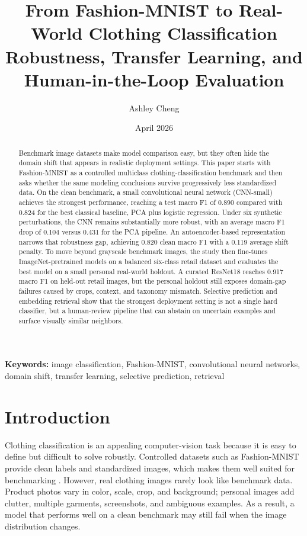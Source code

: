 \documentclass[11pt]{article}
\title{\textbf{From Fashion-MNIST to Real-World Clothing Classification}\\
\large Robustness, Transfer Learning, and Human-in-the-Loop Evaluation}
\author{Ashley Cheng}
\date{April 2026}
\begin{document}
\maketitle

\begin{abstract}
Benchmark image datasets make model comparison easy, but they often hide the domain shift that appears in realistic deployment settings. This paper starts with Fashion-MNIST as a controlled multiclass clothing-classification benchmark and then asks whether the same modeling conclusions survive progressively less standardized data. On the clean benchmark, a small convolutional neural network (CNN-small) achieves the strongest performance, reaching a test macro F1 of 0.890 compared with 0.824 for the best classical baseline, PCA plus logistic regression. Under six synthetic perturbations, the CNN remains substantially more robust, with an average macro F1 drop of 0.104 versus 0.431 for the PCA pipeline. An autoencoder-based representation narrows that robustness gap, achieving 0.820 clean macro F1 with a 0.119 average shift penalty. To move beyond grayscale benchmark images, the study then fine-tunes ImageNet-pretrained models on a balanced six-class retail dataset and evaluates the best model on a small personal real-world holdout. A curated ResNet18 reaches 0.917 macro F1 on held-out retail images, but the personal holdout still exposes domain-gap failures caused by crops, context, and taxonomy mismatch. Selective prediction and embedding retrieval show that the strongest deployment setting is not a single hard classifier, but a human-review pipeline that can abstain on uncertain examples and surface visually similar neighbors.
\end{abstract}

\noindent\textbf{Keywords:} image classification, Fashion-MNIST, convolutional neural networks, domain shift, transfer learning, selective prediction, retrieval

\section{Introduction}

Clothing classification is an appealing computer-vision task because it is easy to define but difficult to solve robustly. Controlled datasets such as Fashion-MNIST provide clean labels and standardized images, which makes them well suited for benchmarking \cite{xiao2017fashion}. However, real clothing images rarely look like benchmark data. Product photos vary in color, scale, crop, and background; personal images add clutter, multiple garments, screenshots, and ambiguous examples. As a result, a model that performs well on a clean benchmark may still fail when the image distribution changes.
\end{document}
